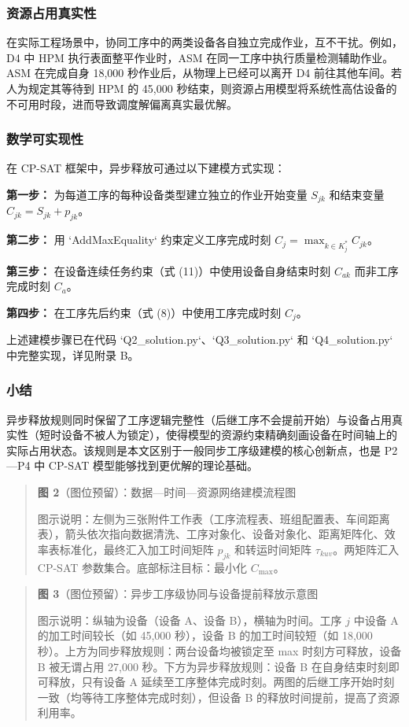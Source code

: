 \documentclass[UTF8,a4paper,12pt]{ctexart}
\begin{document}
\subsubsection{资源占用真实性}
在实际工程场景中，协同工序中的两类设备各自独立完成作业，互不干扰。例如，D4 中 HPM 执行表面整平作业时，ASM 在同一工序中执行质量检测辅助作业。ASM 在完成自身 18,000 秒作业后，从物理上已经可以离开 D4 前往其他车间。若人为规定其等待到 HPM 的 45,000 秒结束，则资源占用模型将系统性高估设备的不可用时段，进而导致调度解偏离真实最优解。

\subsubsection{数学可实现性}
在 CP-SAT 框架中，异步释放可通过以下建模方式实现：

\textbf{第一步：} 为每道工序的每种设备类型建立独立的作业开始变量 $S_{jk}$ 和结束变量 $C_{jk} = S_{jk} + p_{jk}$。

\textbf{第二步：} 用 `AddMaxEquality` 约束定义工序完成时刻 $C_j = \max_{k \in K_j^*} C_{jk}$。

\textbf{第三步：} 在设备连续任务约束（式 (11)）中使用设备自身结束时刻 $C_{ak}$ 而非工序完成时刻 $C_a$。

\textbf{第四步：} 在工序先后约束（式 (8)）中使用工序完成时刻 $C_j$。

上述建模步骤已在代码 `Q2_solution.py`、`Q3_solution.py` 和 `Q4_solution.py` 中完整实现，详见附录 B。

\subsubsection{小结}
异步释放规则同时保留了工序逻辑完整性（后继工序不会提前开始）与设备占用真实性（短时设备不被人为锁定），使得模型的资源约束精确刻画设备在时间轴上的实际占用状态。该规则是本文区别于一般同步工序级建模的核心创新点，也是 P2—P4 中 CP-SAT 模型能够找到更优解的理论基础。

\begin{quote}
\textbf{图 2}（图位预留）：数据—时间—资源网络建模流程图

图示说明：左侧为三张附件工作表（工序流程表、班组配置表、车间距离表），箭头依次指向数据清洗、工序对象化、设备对象化、距离矩阵化、效率表标准化，最终汇入加工时间矩阵 $p_{jk}$ 和转运时间矩阵 $\tau_{kuv}$。两矩阵汇入 CP-SAT 参数集合。底部标注目标：最小化 $C_{\max}$。
\end{quote}

\begin{quote}
\textbf{图 3}（图位预留）：异步工序级协同与设备提前释放示意图

图示说明：纵轴为设备（设备 A、设备 B），横轴为时间。工序 $j$ 中设备 A 的加工时间较长（如 45,000 秒），设备 B 的加工时间较短（如 18,000 秒）。上方为同步释放规则：两台设备均被锁定至 max 时刻方可释放，设备 B 被无谓占用 27,000 秒。下方为异步释放规则：设备 B 在自身结束时刻即可释放，只有设备 A 延续至工序整体完成时刻。两图的后继工序开始时刻一致（均等待工序整体完成时刻），但设备 B 的释放时间提前，提高了资源利用率。
\end{quote}
\end{document}
